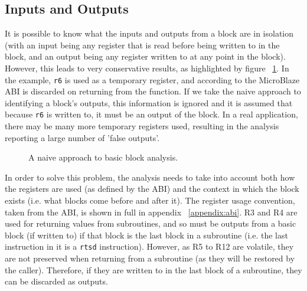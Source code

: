 \documentclass{UoYCSproject}
\newenvironment{monospace}{\ttfamily\small}{\par}
\begin{document}
\subsection{Inputs and Outputs}

It is possible to know what the inputs and outputs from a block are in isolation (with an input being any register that is read
before being written to in the block, and an output being any register written to at any point in the block). However, this leads
to very conservative results, as highlighted by figure ~\ref{fig:analysisNaiveApproach}. In the example, \texttt{r6} is used as a
temporary register, and according to the MicroBlaze ABI \cite{microblaze-ref} is discarded on returning from the function. If we
take the naive approach to identifying a block's outputs, this information is ignored and it is assumed that because \texttt{r6}
is written to, it must be an output of the block. In a real application, there may be many more temporary registers used,
resulting in the analysis reporting a large number of 'false outputs'.

\begin{figure}[H]
  \begin{center}
    \begin{minipage}{0.5\linewidth}
      \begin{monospace}
      
      \end{monospace}
    \end{minipage}
  \end{center}

  \caption{A naive approach to basic block analysis.}
  \label{fig:analysisNaiveApproach}
\end{figure}

In order to solve this problem, the analysis needs to take into account both how the registers are used (as defined by the
ABI) and the context in which the block exists (i.e. what blocks come before and after it).
The register usage convention, taken from the ABI, is shown in full in appendix ~\ref{appendix:abi}. R3 and R4 are used for
returning values from
subroutines, and so must be outputs from a basic block (if written to) if that block is the last block in a subroutine
(i.e. the last instruction in it is a \texttt{rtsd} instruction). However, as R5 to R12 are volatile, they are not preserved
when returning from a subroutine (as they will be restored by the caller). Therefore, if they are written to in the last block
of a subroutine, they can be discarded as outputs.
\end{document}
